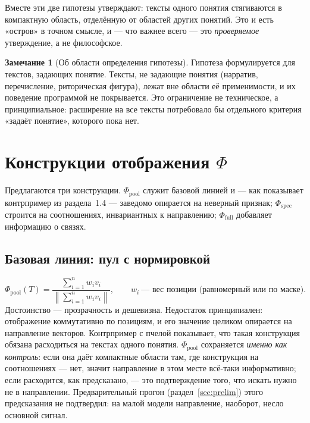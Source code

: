 \documentclass[11pt,a4paper]{article}
\theoremstyle{definition}
\newtheorem{remark}[definition]{Замечание}
\theoremstyle{plain}
\newcommand{\norm}[1]{\left\lVert #1 \right\rVert}
\begin{document}
Вместе эти две гипотезы утверждают: тексты одного понятия стягиваются в компактную область,
отделённую от областей других понятий. Это и есть «остров» в точном смысле, и — что важнее
всего — это \emph{проверяемое} утверждение, а не философское.

\begin{remark}[Об области определения гипотезы]
Гипотеза формулируется для текстов, задающих понятие. Тексты, не задающие понятия (нарратив,
перечисление, риторическая фигура), лежат вне области её применимости, и их поведение
программой не покрывается. Это ограничение не техническое, а принципиальное: расширение на
все тексты потребовало бы отдельного критерия «задаёт понятие», которого пока нет.
\end{remark}

\section{Конструкции отображения $\Phi$}

Предлагаются три конструкции. $\Phi_{\mathrm{pool}}$ служит базовой линией и — как показывает
контрпример из раздела~1.4 — заведомо опирается на неверный признак; $\Phi_{\mathrm{spec}}$
строится на соотношениях, инвариантных к направлению; $\Phi_{\mathrm{full}}$ добавляет
информацию о связях.

\subsection{Базовая линия: пул с нормировкой}

\begin{equation}
\Phi_{\mathrm{pool}}(T)=\frac{\sum_{i=1}^{n} w_i v_i}{\norm{\sum_{i=1}^{n} w_i v_i}},
\qquad w_i\ \text{--- вес позиции (равномерный или по маске).}
\end{equation}
Достоинство — прозрачность и дешевизна. Недостаток принципиален: отображение коммутативно по
позициям, и его значение целиком опирается на направление векторов. Контрпример с пчелой
показывает, что такая конструкция обязана расходиться на текстах одного понятия.
$\Phi_{\mathrm{pool}}$ сохраняется \emph{именно как контроль}: если она даёт компактные
области там, где конструкция на соотношениях — нет, значит направление в этом месте всё-таки
информативно; если расходится, как предсказано, — это подтверждение того, что искать нужно не
в направлении. Предварительный прогон (раздел~\ref{sec:prelim}) этого предсказания не
подтвердил: на малой модели направление, наоборот, несло основной сигнал.
\end{document}
